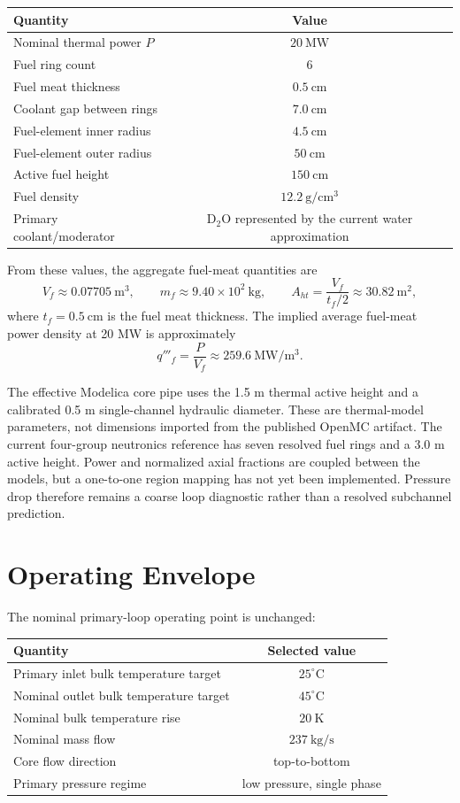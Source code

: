 \documentclass[11pt]{article}
\begin{document}
\begin{center}
\begin{tabular}{lc}
\hline
Quantity & Value \\
\hline
Nominal thermal power $P$ & $20\ \mathrm{MW}$ \\
Fuel ring count & $6$ \\
Fuel meat thickness & $0.5\ \mathrm{cm}$ \\
Coolant gap between rings & $7.0\ \mathrm{cm}$ \\
Fuel-element inner radius & $4.5\ \mathrm{cm}$ \\
Fuel-element outer radius & $50\ \mathrm{cm}$ \\
Active fuel height & $150\ \mathrm{cm}$ \\
Fuel density & $12.2\ \mathrm{g/cm^3}$ \\
Primary coolant/moderator & D$_2$O represented by the current water approximation \\
\hline
\end{tabular}
\end{center}

From these values, the aggregate fuel-meat quantities are
\[
V_f \approx 0.07705\ \mathrm{m^3},
\qquad
m_f \approx 9.40\times 10^2\ \mathrm{kg},
\qquad
A_{ht} = \frac{V_f}{t_f/2} \approx 30.82\ \mathrm{m^2},
\]
where $t_f=0.5\ \mathrm{cm}$ is the fuel meat thickness.  The implied
average fuel-meat power density at 20 MW is approximately
\[
q'''_f = \frac{P}{V_f} \approx 259.6\ \mathrm{MW/m^3}.
\]

The effective Modelica core pipe uses the 1.5 m thermal active height and a
calibrated 0.5 m single-channel hydraulic diameter.  These are thermal-model
parameters, not dimensions imported from the published OpenMC artifact.  The
current four-group neutronics reference has seven resolved fuel rings and a
3.0 m active height.  Power and normalized axial fractions are coupled between
the models, but a one-to-one region mapping has not yet been implemented.
Pressure drop therefore remains a coarse loop diagnostic rather than a
resolved subchannel prediction.

\section{Operating Envelope}

The nominal primary-loop operating point is unchanged:
\begin{center}
\begin{tabular}{lc}
\hline
Quantity & Selected value \\
\hline
Primary inlet bulk temperature target & $25^{\circ}\mathrm{C}$ \\
Nominal outlet bulk temperature target & $45^{\circ}\mathrm{C}$ \\
Nominal bulk temperature rise & $20\ \mathrm{K}$ \\
Nominal mass flow & $237\ \mathrm{kg/s}$ \\
Core flow direction & top-to-bottom \\
Primary pressure regime & low pressure, single phase \\
\hline
\end{tabular}
\end{center}
\end{document}
